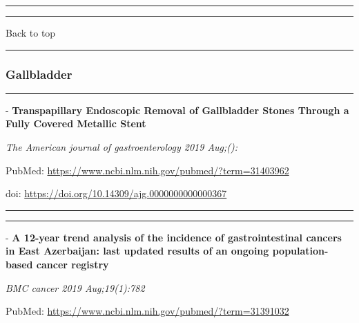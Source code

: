 \documentclass[]{article}
\begin{document}
{}

\begin{center}\rule{0.5\linewidth}{\linethickness}\end{center}

\begin{center}\rule{0.5\linewidth}{\linethickness}\end{center}

Back to top

\begin{center}\rule{0.5\linewidth}{\linethickness}\end{center}

\pagebreak

\hypertarget{gallbladder}{%
\subsubsection{Gallbladder}\label{gallbladder}}

\begin{center}\rule{0.5\linewidth}{\linethickness}\end{center}

 - \textbf{Transpapillary Endoscopic Removal of Gallbladder Stones
Through a Fully Covered Metallic Stent}

\emph{The American journal of gastroenterology 2019 Aug;():}

PubMed: \url{https://www.ncbi.nlm.nih.gov/pubmed/?term=31403962}

doi: \url{https://doi.org/10.14309/ajg.0000000000000367}

{}

{}

\begin{center}\rule{0.5\linewidth}{\linethickness}\end{center}

\begin{center}\rule{0.5\linewidth}{\linethickness}\end{center}

 - \textbf{A 12-year trend analysis of the incidence of gastrointestinal
cancers in East Azerbaijan: last updated results of an ongoing
population-based cancer registry}

\emph{BMC cancer 2019 Aug;19(1):782}

PubMed: \url{https://www.ncbi.nlm.nih.gov/pubmed/?term=31391032}
\end{document}

